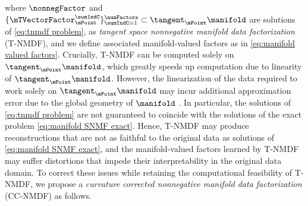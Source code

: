 where $\nonnegFactor$ and $\{\mTVectorFactor_\mPoint^\sumIndC\}_{\sumIndC = 1}^\numFactors \subset \tangent_\mPoint \manifold$ are solutions of \eqref{eq:tnmdf problem}, as \emph{tangent space nonnegative manifold data factorization} (T-NMDF), and we define associated manifold-valued factors as in \eqref{eq:manifold valued factors}. Crucially, T-NMDF can be computed solely on $\tangent_\mPoint \manifold$, which greatly speeds up computation due to linearity of $\tangent_\mPoint \manifold$. However, the linearization of the data required to work solely on $\tangent_\mPoint \manifold$ may incur additional approximation error due to the global geometry of $\manifold$ \citep{diepeveen2023curvature}. In particular, the solutions of \eqref{eq:tnmdf problem} are not guaranteed to coincide with the solutions of the exact problem \eqref{eq:manifold SNMF exact}. Hence, T-NMDF may produce reconstructions that are not as faithful to the original data as solutions of \eqref{eq:manifold SNMF exact}, and the manifold-valued factors learned by T-NMDF may suffer distortions that impede their interpretability in the original data domain. To correct these issues while retaining the computational feasibility of T-NMDF, we propose a \emph{curvature corrected nonnegative manifold data factorization} (CC-NMDF) as follows.

